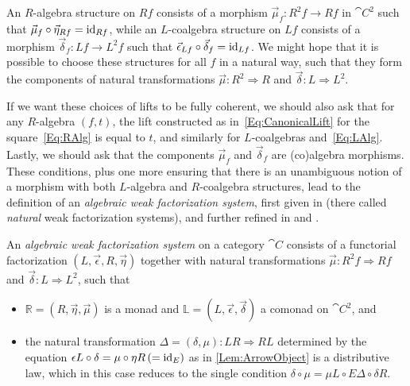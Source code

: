 An $R$-algebra structure on $Rf$ consists of a morphism $\vec{\mu}_f\colon R^2f\to Rf$ in $\cat{C}^2$ such that $\vec{\mu}_f\circ\vec{\eta}_{Rf}=\operatorname{id}_{Rf}$, while an $L$-coalgebra structure on $Lf$ consists of a morphism $\vec{\delta}_f\colon Lf\to L^2f$ such that $\vec{\epsilon}_{Lf}\circ\vec{\delta}_f=\operatorname{id}_{Lf}$. We might hope that it is possible to choose these structures for all $f$ in a natural way, such that they form the components of natural transformations $\vec{\mu}\colon R^2\Rightarrow R$ and $\vec{\delta}\colon L\Rightarrow L^2$.

If we want these choices of lifts to be fully coherent, we should also ask that for any $R$-algebra $(f,t)$, the lift constructed as in~\eqref{Eq:CanonicalLift} for the square~\eqref{Eq:RAlg} is equal to $t$, and similarly for $L$-coalgebras and~\eqref{Eq:LAlg}. Lastly, we should ask that the components $\vec{\mu}_f$ and $\vec{\delta}_f$ are (co)algebra morphisms. These conditions, plus one more ensuring that there is an unambiguous notion of a morphism with both $L$-algebra and $R$-coalgebra structures, lead to the definition of an \emph{algebraic weak factorization system}, first given in \cite{gt:nwfs} (there called \emph{natural} weak factorization systems), and further refined in \cite{garner:nwfs} and \cite{garner:soa}.

\begin{definition}\label{Def:Awfs}
	An \emph{algebraic weak factorization system} on a category $\cat{C}$ consists of a functorial factorization $(L,\vec{\epsilon},R,\vec{\eta})$ together with natural transformations $\vec{\mu}\colon R^2f\Rightarrow Rf$ and $\vec{\delta}\colon L\Rightarrow L^2$, such that
	\begin{itemize}
		\item $\mathbb{R}=(R,\vec{\eta},\vec{\mu})$ is a monad and $\mathbb{L}=(L,\vec{\epsilon},\vec{\delta})$ a comonad on $\cat{C}^2$, and
		\item the natural transformation $\Delta=(\delta,\mu)\colon LR\Rightarrow RL$ determined by the equation $\epsilon L\circ\delta=\mu\circ\eta R \, (=\operatorname{id}_E)$ as in \cref{Lem:ArrowObject} is a distributive law, which in this case reduces to the single condition $\delta\circ\mu = \mu L\circ E\Delta\circ\delta R$.
	\end{itemize}
\end{definition}


